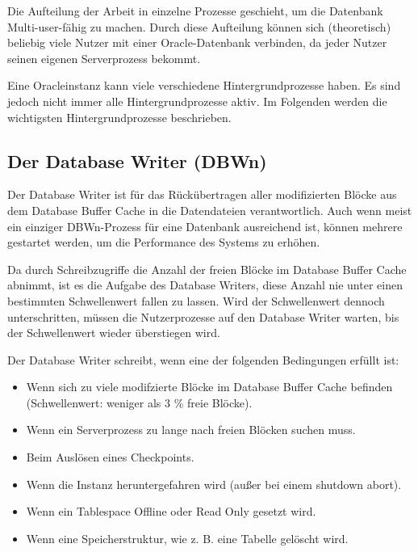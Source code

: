         Die Aufteilung der Arbeit in einzelne Prozesse geschieht, um die Datenbank Multi-user-f\"ahig zu machen. Durch diese Aufteilung k\"onnen sich (theoretisch) beliebig viele Nutzer mit einer Oracle-Datenbank verbinden, da jeder Nutzer seinen eigenen Serverprozess bekommt.

        Eine Oracleinstanz kann viele verschiedene Hintergrundprozesse haben. Es sind jedoch nicht immer alle Hintergrundprozesse aktiv. Im Folgenden werden die wichtigsten Hintergrundprozesse beschrieben.
        \subsection{Der Database Writer (DBWn)}

          Der Database Writer ist f\"ur das R\"uck\"ubertragen aller
          modifizierten Bl\"ocke aus dem Database Buffer Cache in die
          Datendateien verantwortlich. Auch wenn meist ein einziger DBWn-Prozess
          f\"ur eine Datenbank ausreichend ist, k\"onnen mehrere gestartet
          werden, um die Performance des Systems zu erh\"ohen.


          Da durch Schreibzugriffe die Anzahl der freien Bl\"ocke im Database Buffer Cache abnimmt, ist es die Aufgabe des Database Writers, diese Anzahl nie unter einen bestimmten Schwellenwert fallen zu lassen. Wird der Schwellenwert dennoch unterschritten, m\"ussen die Nutzerprozesse auf den Database Writer warten, bis der Schwellenwert wieder \"uberstiegen wird.
          \begin{merke}
            Der Database Writer schreibt, wenn eine der folgenden Bedingungen erf\"ullt ist:
            \begin{itemize}
              \item Wenn sich zu viele modifzierte Bl\"ocke im Database Buffer Cache befinden (Schwellenwert: weniger als 3 \% freie Bl\"ocke).
              \item Wenn ein Serverprozess zu lange nach freien Bl\"ocken suchen muss.
              \item Beim Ausl\"osen eines Checkpoints.
              \item Wenn die Instanz heruntergefahren wird (au\ss er bei einem shutdown abort).
              \item Wenn ein Tablespace Offline oder Read Only gesetzt wird.
              \item Wenn eine Speicherstruktur, wie z. B. eine Tabelle gel\"oscht wird.
            \end{itemize}
          \end{merke}
